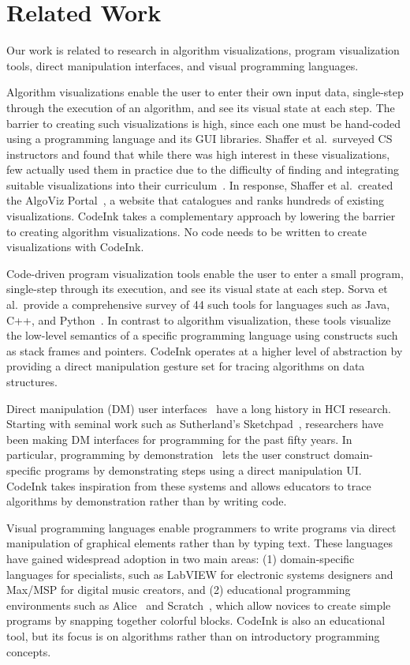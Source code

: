 \section{Related Work}

Our work is related to research in algorithm visualizations, program
visualization tools, direct manipulation interfaces, and visual
programming languages.

Algorithm visualizations enable the user to enter their own input data,
single-step through the execution of an algorithm, and see its visual
state at each step. The barrier to creating such visualizations is high,
since each one must be hand-coded using a programming language and its
GUI libraries. Shaffer et al.\ surveyed CS instructors and found that
while there was high interest in these visualizations, few actually used
them in practice due to the difficulty of finding and integrating
suitable visualizations into their curriculum~\cite{Shaffer2011}. In
response, Shaffer et al.\ created the AlgoViz Portal~\cite{AlgoViz}, a
website that catalogues and ranks hundreds of existing visualizations.
CodeInk takes a complementary approach by lowering the barrier to
creating algorithm visualizations. No code needs to be written to create
visualizations with CodeInk.

Code-driven program visualization tools enable the user to enter a small
program, single-step through its execution, and see its visual state at
each step. Sorva et al.\ provide a comprehensive survey of 44 such tools
for languages such as Java, C++, and Python~\cite{Sorva2013}. In
contrast to algorithm visualization, these tools visualize the low-level
semantics of a specific programming language using constructs such as
stack frames and pointers. CodeInk operates at a higher level of
abstraction by providing a direct manipulation gesture set for tracing
algorithms on data structures.

Direct manipulation (DM) user interfaces~\cite{Hutchins1985} have a long
history in HCI research. Starting with seminal work such as Sutherland's
Sketchpad~\cite{Sutherland1963}, researchers have been making DM
interfaces for programming for the past fifty years. In particular,
programming by demonstration~\cite{Cypher1993} lets the user construct
domain-specific programs by demonstrating steps using a direct
manipulation UI. CodeInk takes inspiration from these systems and allows
educators to trace algorithms by demonstration rather than by writing
code.

Visual programming languages enable programmers to write programs via
direct manipulation of graphical elements rather than by typing text. These
languages have gained widespread adoption in two main areas:
(1) domain-specific languages for specialists, such as LabVIEW for electronic
systems designers and Max/MSP for digital music creators, and (2) educational
programming environments such as Alice~\cite{Alice2008} and
Scratch~\cite{Scratch2008}, which allow novices to create simple programs by
snapping together colorful blocks. CodeInk is also an educational tool, but its
focus is on algorithms rather than on introductory programming concepts.

